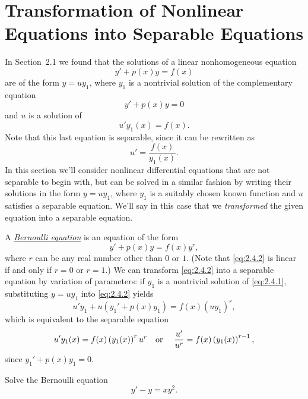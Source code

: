 \section{Transformation of Nonlinear Equations into Separable Equations}

\noindent
In Section~2.1 we found that the solutions of a linear nonhomogeneous equation
\[
  y'+p(x)y=f(x)
\]
are of the form $y=uy_{1}$, where $y_{1}$ is a nontrivial solution of the complementary equation
\begin{equation}
  \label{eq:2.4.1}y'+p(x)y=0
\end{equation}
and $u$ is a solution of
\[
  u'y_{1}(x)=f(x).
\]
Note that this last equation is separable, since it can be rewritten as
\[
  u'=\frac{f(x)}{y_{1}(x)}.
\]
In this section we'll consider nonlinear differential equations that are not separable to begin
with, but can be solved in a similar fashion by writing their solutions in the form $y=uy_{1}$,
where $y_{1}$ is a suitably chosen known function and $u$ satisfies a separable equation. We'll say
in this case that we {\color{blue}\it transformed\/} the given equation into a separable equation.


\noindent
A
\href{https://mathshistory.st-andrews.ac.uk/Biographies/Bernoulli_Jacob/}{\color{blue}
\it Bernoulli equation}
is an equation of the form
\begin{equation}
  \label{eq:2.4.2}y'+p(x)y=f(x)y^{r},
\end{equation}
where $r$ can be any real number other than $0$ or $1$. (Note that \eqref{eq:2.4.2} is linear if and
only if $r=0$ or $r=1$.) We can transform \eqref{eq:2.4.2} into a separable equation by variation of
parameters: if $y_{1}$ is a nontrivial solution of \eqref{eq:2.4.1}, substituting $y=uy_{1}$ into
\eqref{eq:2.4.2} yields
\[
  u'y_{1}+u(y_{1}'+p(x)y_{1})=f(x)(uy_{1})^{r},
\]
which is equivalent to the separable equation
\[
  u'y_{1}(x)=f(x)\left(y_{1}(x)\right)^{r}u^{r}\mbox{\quad or \quad}{\frac{u'}{u^{r}}}=f(x)\left(y_{1}(x)\right)^{r-1},
\]
since $y_{1}'+p(x)y_{1}=0$.

\begin{example}
  \label{example:2.4.1} \rm Solve the Bernoulli equation
  \begin{equation}
    \label{eq:2.4.3}y'-y=xy^{2}.
  \end{equation}
\end{example}

